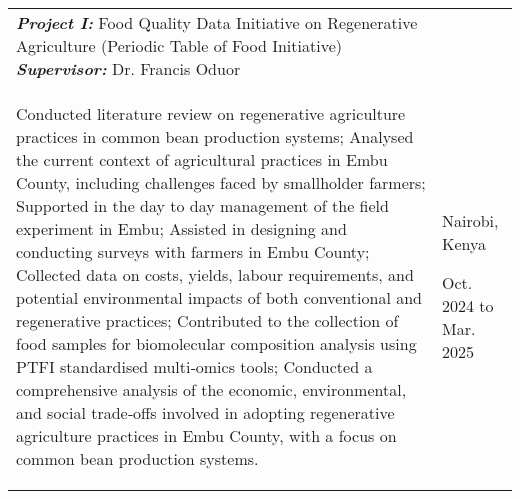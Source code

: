 \documentclass[10pt, letterpaper]{sulmancv}
\begin{document}
        \begin{tabularx}{
             cm-0.13cm
        }{
            K{0.2 cm}
            R{3.5 cm}
        }

            \textbf{\textit{Project I:}} Food Quality Data Initiative on Regenerative Agriculture (Periodic Table of Food Initiative)
            \hspace{2 cm}
            \textbf{\textit{Supervisor:}} Dr. Francis Oduor\\
            
            \vspace{0.01 cm}
            \begin{myenumerate}
                \item[\textcolor{primaryColor}{\faCheckCircle[regular]}] Conducted literature review on regenerative agriculture practices in common bean production systems; Analysed the current context of agricultural practices in Embu County, including challenges faced by smallholder farmers; Supported in the day to day management of the field experiment in Embu; Assisted in designing and conducting surveys with farmers in Embu County; Collected data on costs, yields, labour requirements, and potential environmental impacts of both conventional and regenerative practices; Contributed to the collection of food samples for biomolecular composition analysis using PTFI standardised multi‐omics tools; Conducted a comprehensive analysis of the economic, environmental, and social trade‐offs involved in adopting regenerative agriculture practices in Embu County, with a focus on common bean production systems.
                \end{myenumerate}
            &
            Nairobi, Kenya
            
            Oct. 2024 to Mar. 2025
            
            
        \end{tabularx}
        
\end{document}
